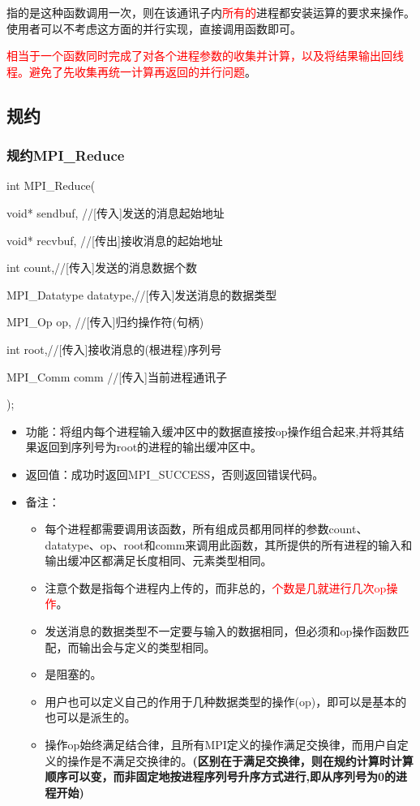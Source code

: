 \documentclass[UTF8]{article}%
\begin{document}
指的是这种函数调用一次，则在该通讯子内\textcolor{red}{所有的}进程都安装运算的要求来操作。使用者可以不考虑这方面的并行实现，直接调用函数即可。

\textcolor{red}{相当于一个函数同时完成了对各个进程参数的收集并计算，以及将结果输出回线程。避免了先收集再统一计算再返回的并行问题}。

\subsection{规约}

\subsubsection{规约MPI\_Reduce}

int MPI\_Reduce(
    
    \qquad void* sendbuf, //[传入]发送的消息起始地址
    
    \qquad void* recvbuf, //[传出]接收消息的起始地址

    \qquad int count,//[传入]发送的消息数据个数

    \qquad MPI\_Datatype datatype,//[传入]发送消息的数据类型 

    \qquad MPI\_Op op, //[传入]归约操作符(句柄)

    \qquad int root,//[传入]接收消息的(根进程)序列号

    \qquad MPI\_Comm comm //[传入]当前进程通讯子
    
);

\begin{itemize}
    \item 功能：将组内每个进程输入缓冲区中的数据直接按op操作组合起来,并将其结果返回到序列号为root的进程的输出缓冲区中。
    \item 返回值：成功时返回MPI\_SUCCESS，否则返回错误代码。
    \item 备注：
    
    {
        \begin{itemize}
            \item 每个进程都需要调用该函数，所有组成员都用同样的参数count、datatype、op、root和comm来调用此函数，其所提供的所有进程的输入和输出缓冲区都满足长度相同、元素类型相同。
            \item 注意个数是指每个进程内上传的，而非总的，\textcolor{red}{个数是几就进行几次op操作}。
            \item 发送消息的数据类型不一定要与输入的数据相同，但必须和op操作函数匹配，而输出会与定义的类型相同。
            \item 是阻塞的。
            \item 用户也可以定义自己的作用于几种数据类型的操作(op)，即可以是基本的也可以是派生的。
            \item 操作op始终满足结合律，且所有MPI定义的操作满足交换律，而用户自定义的操作是不满足交换律的。\textbf{(区别在于满足交换律，则在规约计算时计算顺序可以变，而非固定地按进程序列号升序方式进行,即从序列号为0的进程开始)}
        \end{itemize}
    }
\end{itemize}
\end{document}
